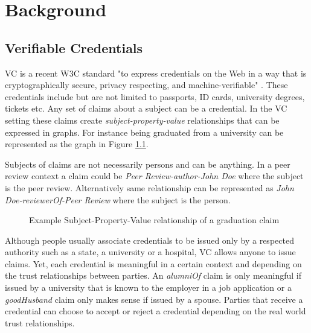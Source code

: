 
\chapter{Background}\label{chapter:background}

\section{Verifiable Credentials}

\acrfull{VC} is a recent \acrshort{W3C} standard "to express credentials on the Web in a way that is cryptographically secure, privacy respecting, and machine-verifiable" \parencite{Sporny.18Kas2019}. These credentials include but are not limited to passports, ID cards, university degrees, tickets etc. Any set of claims about a subject can be a credential. In the \acrshort{VC} setting these claims create \textit{subject-property-value} relationships that can be expressed in graphs. For instance being graduated from a university can be represented as the graph in Figure \ref{fig:alumniOf}. 

Subjects of claims are not necessarily persons and can be anything. In a peer review context a claim could be \textit{Peer Review-author-John Doe} where the subject is the peer review. Alternatively same relationship can be represented as \textit{John Doe-reviewerOf-Peer Review} where the subject is the person.

\begin{figure}[htbp]
  \centering
  
  \caption{Example Subject-Property-Value relationship of a graduation claim \parencite{Sporny.18Kas2019}} \label{fig:alumniOf}
\end{figure}

Although people usually associate credentials to be issued only by a respected authority such as a state, a university or a hospital, \acrlong{VC} allows anyone to issue claims. Yet, each credential is meaningful in a certain context and depending on the trust relationships between parties. An \textit{alumniOf} claim is only meaningful if issued by a university that is known to the employer in a job application or a \textit{goodHusband} claim only makes sense if issued by a spouse. Parties that receive a credential can choose to accept or reject a credential depending on the real world trust relationships.

